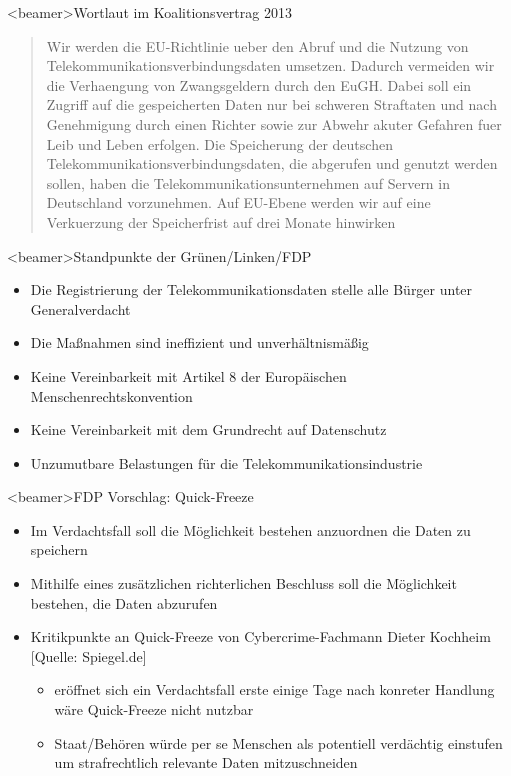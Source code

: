     \begin{frame}<beamer>{Wortlaut im Koalitionsvertrag 2013}
             \begin{quote}
Wir werden die EU-Richtlinie ueber den Abruf und die Nutzung von Telekommunikationsverbindungsdaten umsetzen. Dadurch vermeiden wir die Verhaengung von Zwangsgeldern durch den EuGH. Dabei soll ein Zugriff auf die gespeicherten Daten nur bei schweren Straftaten und nach Genehmigung durch einen Richter sowie zur Abwehr akuter Gefahren fuer Leib und Leben erfolgen. Die Speicherung der deutschen Telekommunikationsverbindungsdaten, die abgerufen und genutzt werden sollen, haben die Telekommunikationsunternehmen auf Servern in Deutschland vorzunehmen. Auf EU-Ebene werden wir auf eine Verkuerzung der Speicherfrist auf drei Monate hinwirken
\end{quote}
   \end{frame}
     
    \begin{frame}<beamer>{Standpunkte der Grünen/Linken/FDP}
       \begin{itemize}
        \item Die Registrierung der Telekommunikationsdaten stelle alle Bürger unter Generalverdacht
        \item Die Maßnahmen sind ineffizient und unverhältnismäßig
        \item Keine Vereinbarkeit mit Artikel 8 der Europäischen Menschenrechtskonvention
        \item Keine Vereinbarkeit mit dem Grundrecht auf Datenschutz
        \item Unzumutbare Belastungen für die Telekommunikationsindustrie
      \end{itemize}
    \end{frame}
        \begin{frame}<beamer>{FDP Vorschlag: Quick-Freeze}
       \begin{itemize}
        \item Im Verdachtsfall soll die Möglichkeit bestehen anzuordnen die Daten zu speichern
        \item Mithilfe eines zusätzlichen richterlichen Beschluss soll die Möglichkeit bestehen, die Daten abzurufen
        \item Kritikpunkte an Quick-Freeze von Cybercrime-Fachmann Dieter Kochheim [Quelle: Spiegel.de]
        \begin{itemize}
        \item eröffnet sich ein Verdachtsfall erste einige Tage nach konreter Handlung wäre Quick-Freeze nicht nutzbar 
        \item Staat/Behören würde per se Menschen als potentiell verdächtig einstufen um strafrechtlich relevante Daten mitzuschneiden 
        \end{itemize}
      \end{itemize}
    \end{frame}

